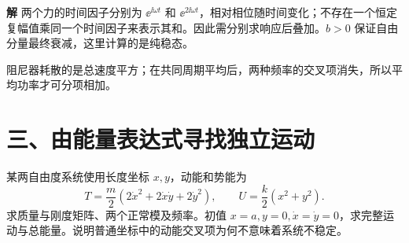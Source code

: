 \documentclass[11pt,openany,fontset=fandol]{ctexbook}
\theoremstyle{plain}\newtheorem{theorem}{定理}[chapter]\newtheorem{proposition}[theorem]{命题}
\theoremstyle{definition}\newtheorem{definition}{定义}[chapter]\newtheorem{example}{例}[chapter]
\theoremstyle{remark}\newtheorem*{remark}{说明}
\newcommand{\SolutionStart}{\par\nobreak\medskip\nobreak\noindent\textbf{解}\quad\ignorespaces}
\newenvironment{solution}{\SolutionStart}{\par\medskip}
\begin{document}
\begin{solution}
两个力的时间因子分别为 $\ee^{\ii\omega t}$ 和 $\ee^{2\ii\omega t}$，相对相位随时间变化；不存在一个恒定复幅值乘同一个时间因子来表示其和。因此需分别求响应后叠加。$b>0$ 保证自由分量最终衰减，这里计算的是纯稳态。

阻尼器耗散的是总速度平方；在共同周期平均后，两种频率的交叉项消失，所以平均功率才可分项相加。
\end{solution}

\section*{三、由能量表达式寻找独立运动}
某两自由度系统使用长度坐标 $x,y$，动能和势能为
\[
T=\frac m2(2\dot x^2+2\dot x\dot y+2\dot y^2),\qquad U=\frac k2(x^2+y^2).
\]
求质量与刚度矩阵、两个正常模及频率。初值 $x=a,y=0,\dot x=\dot y=0$，求完整运动与总能量。说明普通坐标中的动能交叉项为何不意味着系统不稳定。

\end{document}

